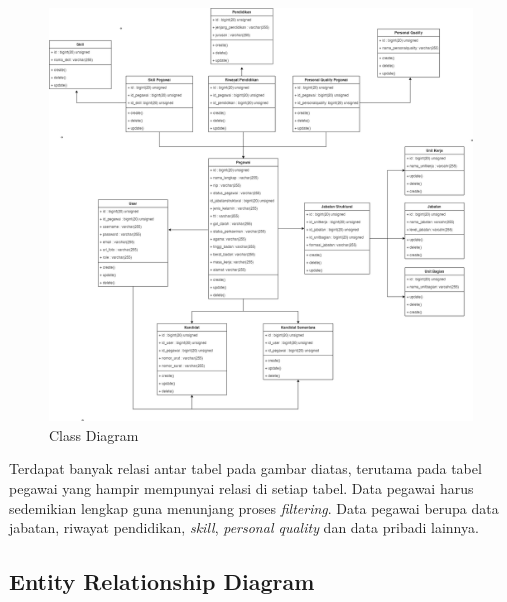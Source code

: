 \begin{figure}
	\centering
	\includegraphics[width=1\textwidth]
	{pics/diagram/classdiagram.png}
	\caption{Class Diagram}
	\label{fig:32}
\end{figure}

Terdapat banyak relasi antar tabel pada gambar diatas, terutama pada tabel pegawai yang hampir mempunyai relasi di setiap tabel. Data pegawai harus sedemikian lengkap guna menunjang proses \textit{filtering}. Data pegawai berupa data jabatan, riwayat pendidikan, \textit{skill},\textit{ personal quality} dan data pribadi lainnya. 

\subsection{Entity Relationship Diagram}

